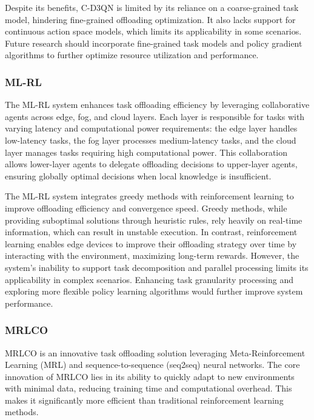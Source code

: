 \documentclass[journal]{IEEEtran}
\begin{document}
Despite its benefits, C-D3QN is limited by its reliance on a coarse-grained task model, hindering fine-grained offloading optimization. It also lacks support for continuous action space models, which limits its applicability in some scenarios. Future research should incorporate fine-grained task models and policy gradient algorithms to further optimize resource utilization and performance.~\cite{zhou03}

\subsubsection{ML-RL}

The ML-RL system enhances task offloading efficiency by leveraging collaborative agents across edge, fog, and cloud layers. Each layer is responsible for tasks with varying latency and computational power requirements: the edge layer handles low-latency tasks, the fog layer processes medium-latency tasks, and the cloud layer manages tasks requiring high computational power. This collaboration allows lower-layer agents to delegate offloading decisions to upper-layer agents, ensuring globally optimal decisions when local knowledge is insufficient.

The ML-RL system integrates greedy methods with reinforcement learning to improve offloading efficiency and convergence speed. Greedy methods, while providing suboptimal solutions through heuristic rules, rely heavily on real-time information, which can result in unstable execution. In contrast, reinforcement learning enables edge devices to improve their offloading strategy over time by interacting with the environment, maximizing long-term rewards. However, the system's inability to support task decomposition and parallel processing limits its applicability in complex scenarios. Enhancing task granularity processing and exploring more flexible policy learning algorithms would further improve system performance.~\cite{zhou04}

\subsubsection{MRLCO}

MRLCO is an innovative task offloading solution leveraging Meta-Reinforcement Learning (MRL) and sequence-to-sequence (seq2seq) neural networks. The core innovation of MRLCO lies in its ability to quickly adapt to new environments with minimal data, reducing training time and computational overhead. This makes it significantly more efficient than traditional reinforcement learning methods.
\end{document}
